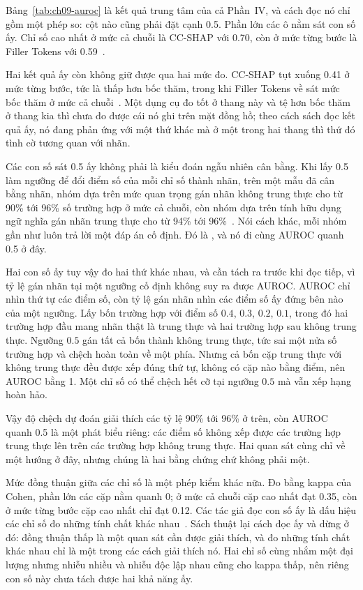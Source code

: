 Bảng~\ref{tab:ch09-auroc} là kết quả trung tâm của cả Phần~IV, và cách đọc nó
chỉ gồm một phép so: cột nào cũng phải đặt cạnh 0.5. Phần lớn các ô nằm
sát con số ấy. Chỉ số cao nhất ở mức cả chuỗi là CC-SHAP với 0.70, còn ở mức
từng bước là Filler Tokens với 0.59~\autocite{p21metrics}.

Hai kết quả ấy còn không giữ được qua hai mức đo. CC-SHAP tụt xuống 0.41 ở
mức từng bước, tức là thấp hơn bốc thăm, trong khi Filler Tokens về sát mức
bốc thăm ở mức cả chuỗi~\autocite{p21metrics}. Một dụng cụ đo tốt ở thang này
và tệ hơn bốc thăm ở thang kia thì chưa đo được cái nó ghi trên mặt đồng hồ;
theo cách sách đọc kết quả ấy, nó đang phản ứng với một thứ khác mà ở một
trong hai thang thì thứ đó tình cờ tương quan với nhãn.

%
Các con số sát 0.5 ấy không phải là kiểu đoán ngẫu nhiên cân bằng. Khi lấy 0.5
làm ngưỡng để đổi điểm số của mỗi chỉ số thành nhãn, trên
một mẫu đã cân bằng nhãn, nhóm dựa trên mức quan trọng gán nhãn không trung
thực cho từ 90\% tới 96\% số trường hợp ở mức cả chuỗi, còn nhóm dựa trên tính
hữu dụng ngữ nghĩa gán nhãn trung thực cho từ 94\% tới
96\%~\autocite{p21metrics}. Nói cách khác, mỗi nhóm gần như luôn trả lời một
đáp án cố định. Đó là , và nó đi cùng
AUROC quanh 0.5 ở đây.

Hai con số ấy tuy vậy đo hai thứ khác nhau, và cần tách ra trước khi đọc tiếp,
vì tỷ lệ gán nhãn tại một ngưỡng cố định không suy ra được AUROC. AUROC chỉ nhìn
thứ tự các điểm số, còn tỷ lệ gán nhãn nhìn các điểm số ấy đứng bên nào của một
ngưỡng. Lấy bốn trường hợp với điểm số $0.4$, $0.3$, $0.2$, $0.1$, trong đó hai
trường hợp đầu mang nhãn thật là trung thực và hai trường hợp sau không trung
thực. Ngưỡng $0.5$ gán tất cả bốn thành không trung thực, tức sai một nửa số
trường hợp và chệch hoàn toàn về một phía. Nhưng cả bốn cặp trung thực với không
trung thực đều được xếp đúng thứ tự, không có cặp nào bằng điểm, nên AUROC bằng
1. Một chỉ số có thể chệch hết cỡ tại ngưỡng $0.5$ mà vẫn xếp hạng hoàn hảo.

Vậy độ chệch dự đoán giải thích các tỷ lệ 90\% tới 96\% ở trên, còn AUROC quanh
0.5 là một phát biểu riêng: các điểm số không xếp được các trường hợp trung thực
lên trên các trường hợp không trung thực. Hai quan sát cùng chỉ về một hướng ở
đây, nhưng chúng là hai bằng chứng chứ không phải một.

Mức đồng thuận giữa các chỉ số là một phép kiểm khác nữa. Đo bằng kappa
của Cohen, phần lớn các cặp nằm quanh 0; ở mức cả chuỗi cặp cao nhất đạt 0.35,
còn ở mức từng bước cặp cao nhất chỉ đạt 0.12. Các tác giả đọc con số ấy là
dấu hiệu các chỉ số đo những tính chất khác nhau~\autocite{p21metrics}. Sách
thuật lại cách đọc ấy và dừng ở đó: đồng thuận thấp là một quan sát cần được
giải thích, và đo những tính chất khác nhau chỉ là một trong các cách giải thích
nó. Hai chỉ số cùng nhắm một đại lượng nhưng nhiễu nhiều và nhiễu độc lập nhau
cũng cho kappa thấp, nên riêng con số này chưa tách được hai khả năng ấy.

